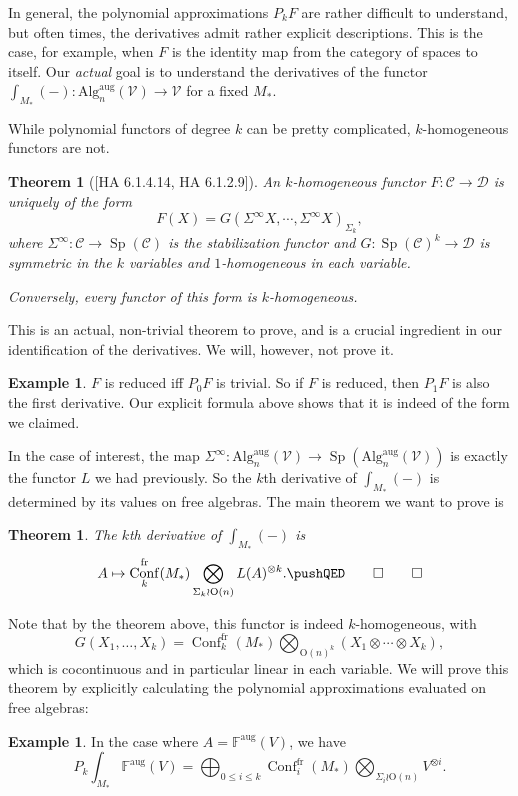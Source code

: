 \documentclass{shortart}
\newtheorem{thm}[lemma]{Theorem}
\theoremstyle{definition}
\newtheorem{eg}[lemma]{Example}
\DeclareMathOperator\Conf{Conf}
\DeclareMathOperator\Sp{Sp}
\newcommand\Algn{\mathrm{Alg}_n^{\mathrm{aug}}(\mathcal{V})}
\newcommand\F{\mathbb{F}^{\mathrm{aug}}}
\newcommand\fr{{\mathrm{fr}}}
\renewcommand\O{\mathrm{O}}
\begin{document}
In general, the polynomial approximations $P_k F$ are rather difficult to understand, but often times, the derivatives admit rather explicit descriptions. This is the case, for example, when $F$ is the identity map from the category of spaces to itself. 
Our \emph{actual} goal is to understand the derivatives of the functor $\int_{M_*} (-)\colon \Algn \to \mathcal{V}$ for a fixed $M_*$.

While polynomial functors of degree $k$ can be pretty complicated, $k$-homogeneous functors are not.
\begin{thm}[{[HA 6.1.4.14, HA 6.1.2.9]}]
  An $k$-homogeneous functor $F\colon \mathcal{C} \to \mathcal{D}$ is uniquely of the form
  \[
    F(X) = G(\Sigma^\infty X, \cdots, \Sigma^\infty X)_{\Sigma_k},
  \]
  where $\Sigma^\infty\colon \mathcal{C} \to \Sp(\mathcal{C})$ is the stabilization functor and $G\colon \Sp(\mathcal{C})^k \to \mathcal{D}$ is symmetric in the $k$ variables and $1$-homogeneous in each variable.

  Conversely, every functor of this form is $k$-homogeneous.
\end{thm}
This is an actual, non-trivial theorem to prove, and is a crucial ingredient in our identification of the derivatives. We will, however, not prove it.

\begin{eg}
  $F$ is reduced iff $P_0 F$ is trivial. So if $F$ is reduced, then $P_1 F$ is also the first derivative. Our explicit formula above shows that it is indeed of the form we claimed.
\end{eg}

In the case of interest, the map $\Sigma^\infty\colon \Algn \to \Sp(\Algn)$ is exactly the functor $L$ we had previously. So the $k$th derivative of $\int_{M_*}(-)$ is determined by its values on free algebras. The main theorem we want to prove is
\begin{thm}
  The $k$th derivative of $\int_{M_*}(-)$ is
  \[
    A \mapsto \Conf_k^{\fr}(M_*) \bigotimes_{\Sigma_k \wr \O(n)} L(A)^{\otimes k}.\fakeqed
  \]
\end{thm}
Note that by the theorem above, this functor is indeed $k$-homogeneous, with
\[
  G(X_1, \ldots, X_k) = \Conf_k^{\fr}(M_*) \bigotimes_{\O(n)^k} (X_1 \otimes \cdots \otimes X_k),
\]
which is cocontinuous and in particular linear in each variable. We will prove this theorem by explicitly calculating the polynomial approximations evaluated on free algebras:
\begin{eg}
  In the case where $A = \F(V)$, we have
  \[
    P_k\int_{M_*} \F(V) = \bigoplus_{0 \leq i \leq k} \Conf_i^{\fr}(M_*) \bigotimes_{\Sigma_i \wr \O(n)} V^{\otimes i}.
  \]
\end{eg}
\end{document}
